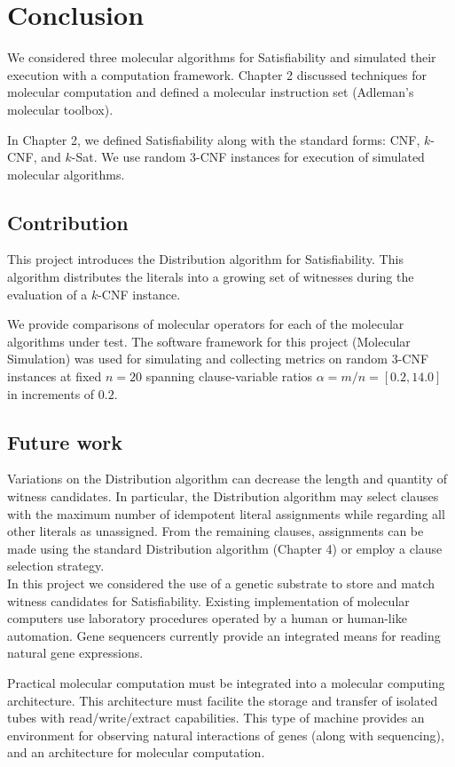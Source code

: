 \chapter{Conclusion}


We considered three molecular algorithms for {\sc Satisfiability} and simulated their execution with a computation framework.  Chapter 2 discussed techniques for molecular computation and defined a molecular instruction set (Adleman's molecular toolbox).

In Chapter 2, we defined {\sc Satisfiability} along with the standard forms: CNF, $k$-CNF, and $k$-{\sc Sat}.  We use random $3$-CNF instances for execution of simulated molecular algorithms.  
	
	\section{Contribution}

This project introduces the Distribution algorithm for {\sc Satisfiability}.  This algorithm distributes the literals into a growing set of witnesses during the evaluation of a $k$-CNF instance.

We provide comparisons of molecular operators for each of the molecular algorithms under test.  The software framework for this project (Molecular Simulation) was used for simulating and collecting metrics on random $3$-CNF instances at fixed $n=20$ spanning clause-variable ratios $\alpha = m/n = [0.2, 14.0]$ in increments of $0.2$.

	\section{Future work}
	

Variations on the Distribution algorithm can decrease the length and quantity of witness candidates.  In particular, the Distribution algorithm may select clauses with the maximum number of idempotent literal assignments while regarding all other literals as unassigned.  From the remaining clauses, assignments can be made using the standard Distribution algorithm (Chapter 4) or employ a clause selection strategy.\\

In this project we considered the use of a genetic substrate to store and match witness candidates for {\sc Satisfiability}.  Existing implementation of molecular computers use laboratory procedures operated by a human or human-like automation.  Gene sequencers currently provide an integrated means for reading natural gene expressions.  

Practical molecular computation must be integrated into a molecular computing architecture.  This architecture must facilite the storage and transfer of isolated tubes with read/write/extract capabilities.  This type of machine provides an environment for observing natural interactions of genes (along with sequencing), and an architecture for molecular computation. 



